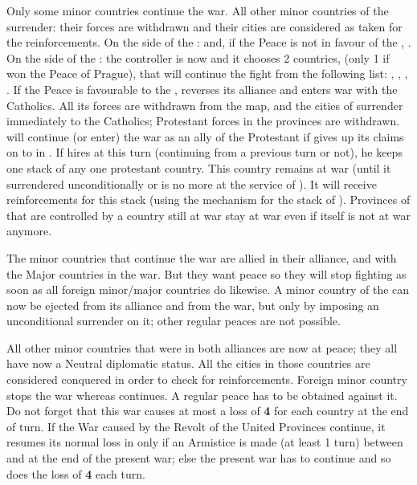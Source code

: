 \begin{digressions}
  \aparag Only some minor countries continue the war. All other minor
  countries of the \HRE surrender: their forces are withdrawn and their cities
  are considered as taken for the reinforcements.
  \bparag On the side of the \ligue: \HAB and, if the Peace is not in favour
  of the \alliance, \paysBaviere.
  \bparag On the side of the \alliance: the controller is now \SUE and it
  chooses 2 countries, (only 1 if \ligue won the Peace of Prague), that will
  continue the fight from the following list: \paysHesse, \paysHanovre,
  \paysPalatinat, \paysSaxe.
  \bparag If the Peace is favourable to the \ligue, \paysSaxe reverses its
  alliance and enters war with the Catholics.  All its forces are withdrawn
  from the map, and the cities of \paysSaxe surrender immediately to the
  Catholics; Protestant forces in the provinces are withdrawn.
  \bparag \paysBrandebourg will continue (or enter) the war as an ally of the
  Protestant if \SUE gives up its claims on  to
  \paysBrandebourg in .
  \bparag If \FRA hires  at this turn (continuing from a
  previous turn or not), he keeps one stack of any one protestant
  country. This country remains at war (until it surrendered unconditionally
  or  is no more at the service of \FRA). It will receive
  reinforcements for this stack (using the mechanism for the stack of
  ).
  \bparag Provinces of \paysHanse that are controlled by a country still at
  war stay at war even if \paysHanse itself is not at war anymore.

  \aparag The minor countries that continue the war are allied in their
  alliance, and with the Major countries in the war. But they want peace so
  they will stop fighting as soon as all foreign minor/major countries do
  likewise.
  \bparag A minor country of the \HRE can now be ejected from its alliance and
  from the war, but only by imposing an unconditional surrender on it; other
  regular peaces are not possible.

  \aparag All other minor countries that were in both alliances are now at
  peace; they all have now a Neutral diplomatic status.  All the cities in
  those countries are considered conquered in order to check for
  reinforcements.
  \aparag Foreign minor country \DANmin stops the war whereas \HOLmin
  continues. A regular peace has to be obtained against it.
  \aparag Do not forget that this war causes at most a loss of {\bf 4} \STAB
  for each country at the end of turn.  If the War caused by the Revolt of the
  United Provinces continue, it resumes its normal loss in \STAB only if an
  Armistice is made (at least 1 turn) between \SPA and \HOL at the end of the
  present war; else the present war has to continue and so does the loss of
  {\bf 4} \STAB each turn.



\end{digressions}
